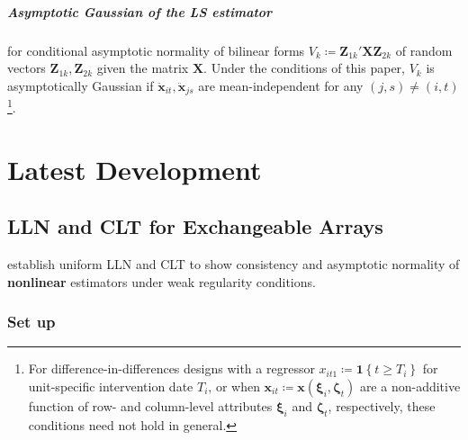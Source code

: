 \documentclass[twoside]{article}
\begin{document}
\subparagraph*{Asymptotic Gaussian of the LS estimator} for conditional asymptotic normality of bilinear forms $V_k\coloneq \mathbf{Z}_{1k}'\mathbf{XZ}_{2k}$ of random vectors $\mathbf{Z}_{1k},\mathbf{Z}_{2k}$ given the matrix $\mathbf{X}$. 
Under the conditions of this paper, $V_k$ is asymptotically Gaussian if $\ddot{\mathbf{x}}_{it},\ddot{\mathbf{x}}_{js}$ are mean-independent for any $(j,s)\neq (i,t)$\footnote{For difference-in-differences designs with a regressor $x_{it1}\coloneq\mathbf{1}\left\{t\geq T_i\right\}$ for unit-specific intervention date $T_i$, or when $\mathbf{x}_{it}\coloneq\mathbf{x}\left(\boldsymbol{\xi}_i,\boldsymbol{\zeta}_t\right)$ are a non-additive function of row- and column-level attributes $\boldsymbol{\xi}_i$ and $\boldsymbol{\zeta}_t$, respectively, these conditions need not hold in general.}.

\section{Latest Development}
\subsection{LLN and CLT for Exchangeable Arrays}
\citet{davezies2021empirical} establish uniform LLN and CLT to show consistency and asymptotic normality of \textbf{nonlinear} estimators under weak regularity conditions.

\subsubsection{Set up}
\end{document}
